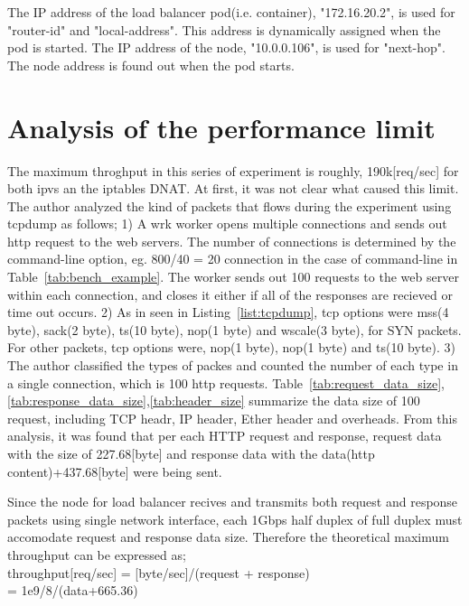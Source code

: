 The IP address of the load balancer pod(i.e. container), "172.16.20.2", is used for "router-id" and "local-address".
This address is dynamically assigned when the pod is started.
The IP address of the node, "10.0.0.106", is used for "next-hop".
The node address is found out when the pod starts.



\chapter{Analysis of the performance limit}
\label{appendix:performance_limit}

The maximum throghput in this series of experiment is roughly, 190k[req/sec] for both ipvs an the iptables DNAT.
At first, it was not clear what caused this limit.
The author analyzed the kind of packets that flows during the experiment using tcpdump\cite{jacobson1989tcpdump} as follows;
1) A wrk worker opens multiple connections and sends out http request to the web servers. The number of connections is determined by the command-line option, eg. 800/40 = 20 connection in the case of command-line in Table~\ref{tab:bench_example}. The worker sends out 100 requests to the web server within each connection, and closes it either if all of the responses are recieved or time out occurs.
2) As in seen in Listing~\ref{list:tcpdump}, tcp options were mss(4 byte), sack(2 byte), ts(10 byte), nop(1 byte) and wscale(3 byte), for SYN packets. For other packets, tcp options were, nop(1 byte), nop(1 byte) and ts(10 byte).
3) The author classified the types of packes and counted the number of each type in a single connection, which is 100 http requests. Table~\ref{tab:request_data_size},\ref{tab:response_data_size},\ref{tab:header_size} summarize the data size of 100 request, including TCP headr, IP header, Ether header and overheads. 
From this analysis, it was found that per each HTTP request and response,
request data with the size of 227.68[byte] and response data with the data(http content)+437.68[byte] were being sent.   

Since the node for load balancer recives and transmits both request and response packets using single network interface, each 1Gbps half duplex of full duplex must accomodate request and response data size.
Therefore the theoretical maximum throughput can be expressed as; \\
throughput[req/sec] = [byte/sec]/(request + response) \\
= 1e9/8/(data+665.36)

